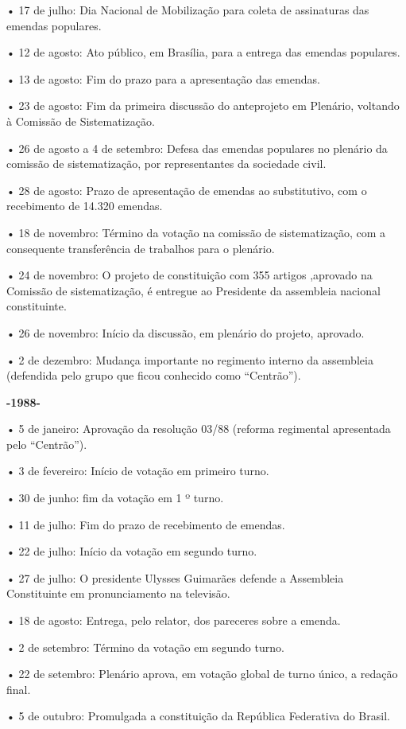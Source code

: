 • 17 de julho: Dia Nacional de Mobilização para coleta de assinaturas
das emendas populares.

• 12 de agosto: Ato público, em Brasília, para a entrega das emendas
populares.

• 13 de agosto: Fim do prazo para a apresentação das emendas.

• 23 de agosto: Fim da primeira discussão do anteprojeto em Plenário,
voltando à Comissão de Sistematização.

• 26 de agosto a 4 de setembro: Defesa das emendas populares no plenário
da comissão de sistematização, por representantes da sociedade civil.

• 28 de agosto: Prazo de apresentação de emendas ao substitutivo, com o
recebimento de 14.320 emendas.

• 18 de novembro: Término da votação na comissão de sistematização, com
a consequente transferência de trabalhos para o plenário.

• 24 de novembro: O projeto de constituição com 355 artigos ,aprovado na
Comissão de sistematização, é entregue ao Presidente da assembleia
nacional constituinte.

• 26 de novembro: Início da discussão, em plenário do projeto, aprovado.

• 2 de dezembro: Mudança importante no regimento interno da assembleia
(defendida pelo grupo que ficou conhecido como ``Centrão'').

\textbf{-1988-}

• 5 de janeiro: Aprovação da resolução 03/88 (reforma regimental
apresentada pelo ``Centrão'').

• 3 de fevereiro: Início de votação em primeiro turno.

• 30 de junho: fim da votação em 1 º turno.

• 11 de julho: Fim do prazo de recebimento de emendas.

• 22 de julho: Início da votação em segundo turno.

• 27 de julho: O presidente Ulysses Guimarães defende a Assembleia
Constituinte em pronunciamento na televisão.

• 18 de agosto: Entrega, pelo relator, dos pareceres sobre a emenda.

• 2 de setembro: Término da votação em segundo turno.

• 22 de setembro: Plenário aprova, em votação global de turno único, a
redação final.

• 5 de outubro: Promulgada a constituição da República Federativa do
Brasil.
